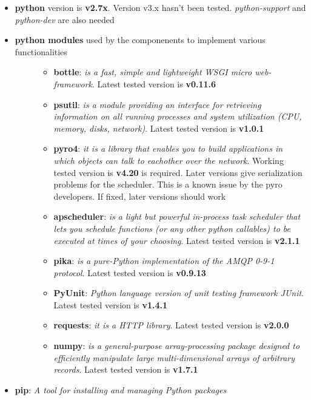 \documentclass[letterpaper,10pt,english]{sphinxhowto}
\begin{document}
\begin{itemize}
\item {} 
\textbf{python} version is \textbf{v2.7x}. Version v3.x hasn't been tested. \emph{python-support} and \emph{python-dev} are also needed

\item {} \begin{description}
\item[{\textbf{python modules} used by the componenents to implement various functionalities}] \leavevmode\begin{itemize}
\item {} 
\textbf{bottle}: \emph{is a fast, simple and lightweight WSGI micro web-framework}. Latest tested version is \textbf{v0.11.6}

\item {} 
\textbf{psutil}: \emph{is a module providing an interface for retrieving information on all running processes and system utilization (CPU, memory, disks, network)}. Latest tested version is \textbf{v1.0.1}

\item {} 
\textbf{pyro4}: \emph{it is a library that enables you to build applications in which objects can talk to eachother over the network}. Working tested version is \textbf{v4.20} is required. Later versions give serialization problems for the scheduler. This is a known issue by the pyro developers. If fixed, later versions should work

\item {} 
\textbf{apscheduler}: \emph{is a light but powerful in-process task scheduler that lets you schedule functions (or any other python callables) to be executed at times of your choosing}. Latest tested version is \textbf{v2.1.1}

\item {} 
\textbf{pika}: \emph{is a pure-Python implementation of the AMQP 0-9-1 protocol}. Latest tested version is \textbf{v0.9.13}

\item {} 
\textbf{PyUnit}: \emph{Python language version of unit testing framework JUnit}. Latest tested version is \textbf{v1.4.1}

\item {} 
\textbf{requests}: \emph{it is a HTTP library}. Latest tested version is \textbf{v2.0.0}

\item {} 
\textbf{numpy}: \emph{is a general-purpose array-processing package designed to efficiently manipulate large multi-dimensional arrays of arbitrary records}. Latest tested version is \textbf{v1.7.1}

\end{itemize}

\end{description}

\item {} 
\textbf{pip}: \emph{A tool for installing and managing Python packages}

\end{itemize}
\end{document}
